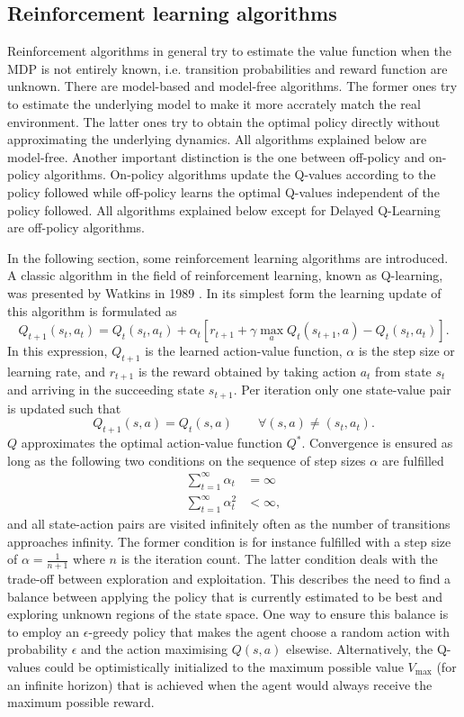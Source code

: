\documentclass[../main.tex]{subfiles}
\begin{document}
\subsection{Reinforcement learning algorithms}
Reinforcement algorithms in general try to estimate the value function when the MDP is not entirely known, i.e. transition probabilities and reward function are unknown. There are model-based and model-free algorithms. The former ones try to estimate the underlying model to make it more accrately match the real environment. The latter ones try to obtain the optimal policy directly without approximating the underlying dynamics. All algorithms explained below are model-free. Another important distinction is the one between off-policy and on-policy algorithms. On-policy algorithms update the Q-values according to the policy followed while off-policy learns the optimal Q-values independent of the policy followed. All algorithms explained below except for Delayed Q-Learning are off-policy algorithms.\par
In the following section, some reinforcement learning algorithms are introduced. A classic algorithm in the field of reinforcement learning, known as Q-learning, was presented by Watkins in 1989 \cite{watkins1992q}. In its simplest form the learning update of this algorithm is formulated as
\begin{equation}
Q_{t+1}(s_t,a_t) = Q_{t}(s_t,a_t) + \alpha_t \left[ r_{t+1}+\gamma \max_a Q_{t}(s_{t+1},a) - Q_{t}(s_t,a_t)\right].
\end{equation}
In this expression, $Q_{t+1}$ is the learned action-value function, $\alpha$ is the step size or learning rate, and $r_{t+1}$ is the reward obtained by taking action $a_t$ from state $s_t$ and arriving in the succeeding state $s_{t+1}$.
Per iteration only one state-value pair is updated such that
\begin{equation}
    Q_{t+1}(s,a) = Q_{t}(s,a) \qquad \forall (s,a) \neq (s_t,a_t).
\end{equation}
$Q$ approximates the optimal action-value function $Q^*$. Convergence is ensured as long as the following two conditions on the sequence of step sizes $\alpha$ are fulfilled \cite{jaakkola1994convergence}
\begin{align}\label{eq:stepsize}
    \sum_{t=1}^\infty \alpha_t &= \infty\\
    \sum_{t=1}^\infty \alpha_t^2 &< \infty ,
\end{align}
and all state-action pairs are visited infinitely often as the number of transitions approaches infinity. The former condition is for instance fulfilled with a step size of $\alpha = \frac{1}{n+1}$ where $n$ is the iteration count. The latter condition deals with the trade-off between exploration and exploitation. This describes the need to find a balance between applying the policy that is currently estimated to be best and exploring unknown regions of the state space. One way to ensure this balance is to employ an $\epsilon$-greedy policy that makes the agent choose a random action with probability $\epsilon$ and the action maximising $Q(s,a)$ elsewise. Alternatively, the Q-values could be optimistically initialized to the maximum possible value $V_{\max}$ (for an infinite horizon) that is achieved when the agent would always receive the maximum possible reward. 
\end{document}
